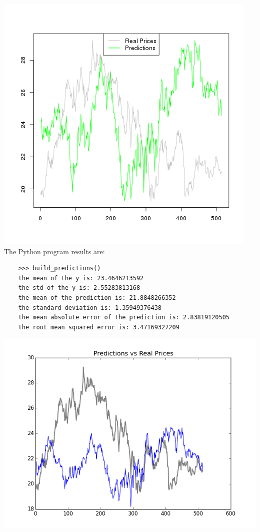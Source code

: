 \documentclass[
  twoside,
  11pt, a4paper,
  footinclude=true,
  headinclude=true,
  cleardoublepage=empty
]{scrreprt}
\begin{document}
    \includegraphics[scale=0.75]{RPredicitions.png}
    The Python program results are:
    \begin{verbatim}
    >>> build_predictions()
    the mean of the y is: 23.4646213592
    the std of the y is: 2.55283813168
    the mean of the prediction is: 21.8848266352
    the standard deviation is: 1.35949376438
    the mean absolute error of the prediction is: 2.83819120505
    the root mean squared error is: 3.47169327209
    \end{verbatim}
    \includegraphics[scale=0.75]{PythonPredictions.png}\\
\end{document}
